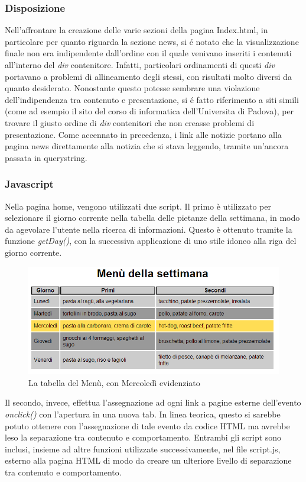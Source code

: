 \documentclass[10pt,a4paper,onecolumn]{article}
\begin{document}
\subsubsection{Disposizione}

Nell'affrontare la creazione delle varie sezioni della pagina Index.html, in particolare per quanto riguarda la sezione news, si é notato che la visualizzazione finale non era indipendente dall'ordine con il quale venivano inseriti i contenuti all'interno del \textit{div} contenitore. 
Infatti, particolari ordinamenti di questi \textit{div} portavano a problemi di allineamento degli stessi, con risultati molto diversi da quanto desiderato. Nonostante questo potesse sembrare una violazione dell'indipendenza tra contenuto e presentazione, si é fatto riferimento a siti simili (come ad esempio il sito del corso di informatica dell'Universita di Padova), per trovare il giusto ordine di \textit{div} contenitori che non creasse problemi di presentazione.
Come accennato in precedenza, i link alle notizie portano alla pagina news direttamente alla notizia che si stava leggendo, tramite un'ancora passata in querystring.

\subsubsection{Javascript}

Nella pagina home, vengono utilizzati due script. Il primo è utilizzato per selezionare il giorno corrente nella tabella delle pietanze della settimana, in modo da agevolare l'utente nella ricerca di informazioni. Questo è ottenuto tramite la funzione \textit{getDay()}, con la successiva applicazione di uno stile idoneo alla riga del giorno corrente.
\begin{figure}[h]
\centering
\includegraphics[scale=0.45]{tabellaMenu}
\caption{La tabella del Menù, con Mercoledì evidenziato}
\label{tabellaMenu}
\end{figure}
Il secondo, invece, effettua l'assegnazione ad ogni link a pagine esterne dell'evento \textit{onclick()} con l'apertura in una nuova tab. In linea teorica, questo si sarebbe potuto ottenere con l'assegnazione di tale evento da codice HTML ma avrebbe leso la separazione tra contenuto e comportamento. 
Entrambi gli script sono inclusi, insieme ad altre funzioni utilizzate successivamente, nel file script.js, esterno alla pagina HTML di modo da creare un ulteriore livello di separazione tra contenuto e comportamento.
\end{document}
